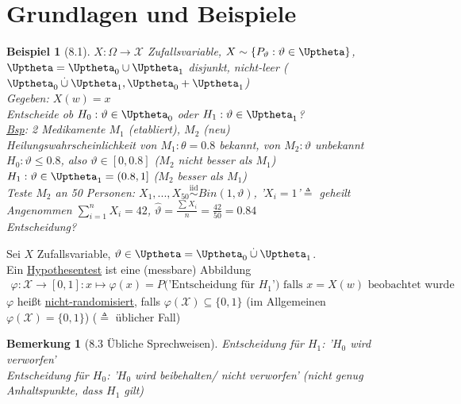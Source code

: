 \documentclass[a4paper,openany]{book}
\theoremstyle{mytheoremstyle}
\newtheorem*{bei}{Beispiel}
\newtheorem*{bem}{Bemerkung}
\theoremstyle{mytheoremstyle2}
\begin{document}
\section{Grundlagen und Beispiele} 
\begin{bei}[8.1]
  $X:\Omega \to \mathcal{X}$ Zufallsvariable, $X\sim\{P _{\vartheta }:\vartheta \in \Uptheta\}$, $\Uptheta=\Uptheta_0 \cup \Uptheta_1$ disjunkt, nicht-leer ($\Uptheta_0 \overset{.}\cup \Uptheta_1,\Uptheta_0+\Uptheta_1$) \\
  Gegeben: $X(w)=x$ \\
  Entscheide ob $H_0:\vartheta \in \Uptheta_0$ oder $H_1:\vartheta \in \Uptheta_1$? \\
  \underline{Bsp}: 2 Medikamente $M_1$ (etabliert), $M_2$ (neu) \\
  Heilungswahrscheinlichkeit von $M_1:\theta =0.8$ bekannt, von $M_2:\vartheta $ unbekannt \\
  $H_0:\vartheta \leq 0.8$, also $\vartheta \in [0,0.8]$ ($M_2$ nicht besser als $M_1$)\\
  $H_1:\vartheta \in \Uptheta_1=(0.8,1]$ ($M_2$ besser als $M_1$) \\
  Teste $M_2$ an 50 Personen: $X_1,...,X _{50}\overset{\text{iid}}\sim Bin(1,\vartheta )$, '$X_i=1$'$\triangleq$ geheilt   \\
  Angenommen $\sum_{i=1}^{n}{X_i}=42$, $\hat{\vartheta }=\frac{\sum_{}^{}{X_i}}{n}=\frac{42}{50}=0.84$ \\
  Entscheidung?
\end{bei}
\begin{defi}{8.2}{}
  Sei $X$ Zufallsvariable, $\vartheta \in \Uptheta=\Uptheta_0 \overset{.}\cup \Uptheta_1$. \\
  Ein \underline{Hypothesentest} ist eine (messbare) Abbildung 
  \begin{align*}
    \varphi :\mathcal{X}\to[0,1]:x\mapsto \varphi (x)=P(\text{'Entscheidung für $H_1$') falls $x=X(w)$ beobachtet wurde }
  \end{align*}
  $\varphi $ heißt \underline{nicht-randomisiert}, falls $\varphi (\mathcal{X})\subseteq \{0,1\}$ (im Allgemeinen $\varphi (\mathcal{X})=\{0,1\}$) ($\triangleq$ üblicher Fall)
\end{defi}
\begin{bem}[8.3 Übliche Sprechweisen]
  Entscheidung für $H_1$: '$H_0$ wird verworfen' \\
  Entscheidung für $H_0$: '$H_0$ wird beibehalten/ nicht verworfen' (nicht genug Anhaltspunkte, dass $H_1$ gilt)
\end{bem}
\end{document}
